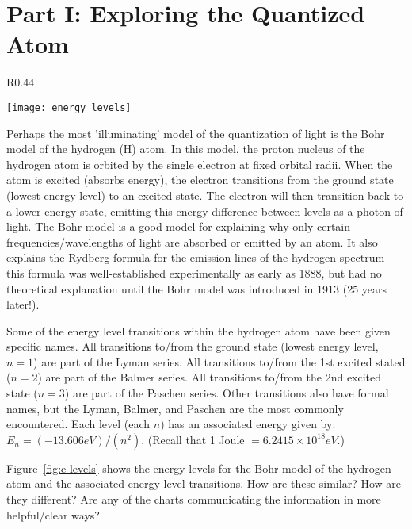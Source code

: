 \section*{Part I: Exploring the Quantized Atom}
%
\begin{wrapfigure}{R}{0.44\textwidth}
  \vspace{-15pt}  
  \begin{center}
    \texttt{[image: energy\_levels]}
  \end{center}
  \vspace{-20pt}
  \caption{Energy level transitions for the Bohr Model of the hydrogen atom.}
  \label{fig:e-levels}
  \vspace{-10pt}
\end{wrapfigure}
%
Perhaps the most 'illuminating' model of the quantization of light is the Bohr model of the hydrogen (H) atom. 
In this model, the proton nucleus of the hydrogen atom is orbited by the single electron at fixed orbital radii. 
When the atom is excited (absorbs energy), the electron transitions from the ground state (lowest energy level) to an excited state. 
The electron will then transition back to a lower energy state, emitting this energy difference between levels as a photon of light. 
The Bohr model is a good model for explaining why only certain frequencies/wavelengths of light are absorbed or emitted by an atom. 
It also explains the Rydberg formula for the emission lines of the hydrogen spectrum—this formula was well-established experimentally as early as 1888, but had no theoretical explanation until the Bohr model was introduced in 1913 (25 years later!). 
\par 
Some of the energy level transitions within the hydrogen atom have been given specific names. 
All transitions to/from the ground state (lowest energy level, $n = 1$) are part of the Lyman series. 
All transitions to/from the 1st excited stated ($n = 2$) are part of the Balmer series. 
All transitions to/from the 2nd excited state ($n = 3$) are part of the Paschen series. 
Other transitions also have formal names, but the Lyman, Balmer, and Paschen are the most commonly encountered. 
Each level (each $n$) has an associated energy given by: $E_{n}=(-13.606 eV)/(n^{2})$. 
(Recall that 1 Joule $= 6.2415 \times 10^{18} eV$.) 
\par 
Figure~\ref{fig:e-levels} shows the energy levels for the Bohr model of the hydrogen atom and the associated energy level transitions. 
How are these similar? 
How are they different? 
Are any of the charts communicating the information in more helpful/clear ways? 

